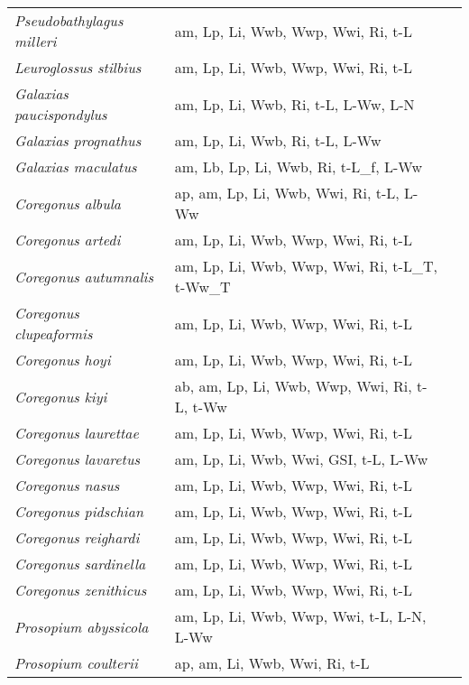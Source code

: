 {\begin{longtable}[c]{p{3.5cm}p{5.5cm}p{5.5cm}}
\emph{Pseudobathylagus milleri} &  am, Lp, Li, Wwb, Wwp, Wwi, Ri, t-L & \citet{ChilTayl1980} \\
\emph{Leuroglossus stilbius} &  am, Lp, Li, Wwb, Wwp, Wwi, Ri, t-L & \citet{ChilTayl1980} \\
\emph{Galaxias paucispondylus} &  am, Lp, Li, Wwb, Ri, t-L, L-Ww, L-N & \citet{Bonn1990,Bonn1992,BoyMorr2007} \\
\emph{Galaxias prognathus} &  am, Lp, Li, Wwb, Ri, t-L, L-Ww & \citet{Bonn1990,Bonn1992,BoyMorr2007} \\
\emph{Galaxias maculatus} &  am, Lb, Lp, Li, Wwb, Ri, t-L\_f, L-Ww & \citet{Bonn1990,BarrBatt2012,BoyMorr2007} \\
\emph{Coregonus albula} &  ap, am, Lp, Li, Wwb, Wwi, Ri, t-L, L-Ww & \citet{KozoKozo2010} \\
\emph{Coregonus artedi} &  am, Lp, Li, Wwb, Wwp, Wwi, Ri, t-L & \citet{StocEben2009} \\
\emph{Coregonus autumnalis} &  am, Lp, Li, Wwb, Wwp, Wwi, Ri, t-L\_T, t-Ww\_T & \citet{FechFitz1993} \\
\emph{Coregonus clupeaformis} &  am, Lp, Li, Wwb, Wwp, Wwi, Ri, t-L & \citet{OostHile1949} \\
\emph{Coregonus hoyi} &  am, Lp, Li, Wwb, Wwp, Wwi, Ri, t-L & \citet{Scha2004} \\
\emph{Coregonus kiyi} &  ab, am, Lp, Li, Wwb, Wwp, Wwi, Ri, t-L, t-Ww & \citet{DeasHile1947} \\
\emph{Coregonus laurettae} &  am, Lp, Li, Wwb, Wwp, Wwi, Ri, t-L & \citet{Alt1973} \\
\emph{Coregonus lavaretus} &  am, Lp, Li, Wwb, Wwi, GSI, t-L, L-Ww & \citet{Tolo1997,SzczSzcz2010} \\
\emph{Coregonus nasus} &  am, Lp, Li, Wwb, Wwp, Wwi, Ri, t-L & \citet{GrifGall1992} \\
\emph{Coregonus pidschian} &  am, Lp, Li, Wwb, Wwp, Wwi, Ri, t-L & \citet{BochZuyk2018} \\
\emph{Coregonus reighardi} &  am, Lp, Li, Wwb, Wwp, Wwi, Ri, t-L & \citet{Jobe1943} \\
\emph{Coregonus sardinella} &  am, Lp, Li, Wwb, Wwp, Wwi, Ri, t-L & \citet{MuirVecs2014} \\
\emph{Coregonus zenithicus} &  am, Lp, Li, Wwb, Wwp, Wwi, Ri, t-L & \citet{MuirVecs2014} \\
\emph{Prosopium abyssicola} &  am, Lp, Li, Wwb, Wwp, Wwi, t-L, L-N, L-Ww & \citet{Thom2003,Shes2017} \\
\emph{Prosopium coulterii} &  ap, am, Li, Wwb, Wwi, Ri, t-L & \citet{StewOgle2016} \\

\end{longtable}}
